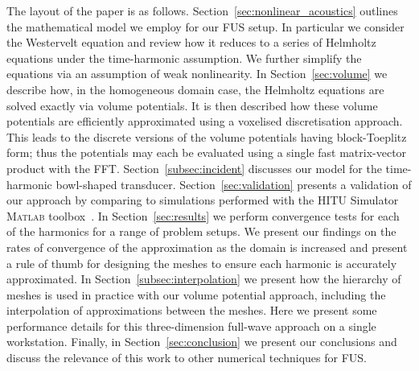 \documentclass[11pt]{article}
\numberwithin{equation}{section}
\newcommand{\red}[1]{{\color{black} #1}}
\begin{document}
The layout of the paper is as follows. Section~\ref{sec:nonlinear_acoustics}
outlines the mathematical model we employ for our \red{FUS} setup. In particular we 
consider the Westervelt equation and review how it reduces to a series of Helmholtz 
equations under the time-harmonic assumption. We further simplify the equations
via an assumption of weak nonlinearity. In Section~\ref{sec:volume} we 
describe how, in the homogeneous domain case, the Helmholtz equations are solved 
exactly via volume potentials. It is then described how these volume potentials 
are efficiently approximated using a voxelised discretisation 
approach. This leads to the discrete versions of the volume potentials having 
block-Toeplitz form; thus the potentials may each be evaluated using 
a single fast matrix-vector product with the FFT. Section~\ref{subsec:incident} 
discusses our model for the time-harmonic bowl-shaped transducer.
Section~\ref{sec:validation} 
presents a validation of our approach by comparing to simulations performed 
with the HITU Simulator \textsc{Matlab} toolbox~\cite{HITUwebpage,soneson2017extending}.
In Section~\ref{sec:results} we perform convergence tests for each of the 
harmonics for a range of problem setups. We present our findings on the rates 
of convergence of the approximation as the domain is increased and present a rule 
of thumb for designing the meshes to ensure each harmonic is accurately 
approximated. In Section~\ref{subsec:interpolation} we present how the hierarchy 
of meshes is used in practice with our volume potential approach, including the 
interpolation of approximations between the meshes. Here we present some performance 
details for this three-dimension full-wave approach on a single workstation.
Finally, in Section~\ref{sec:conclusion} we 
present our conclusions and discuss the relevance of this work to other numerical 
techniques for \red{FUS}.
\end{document}
